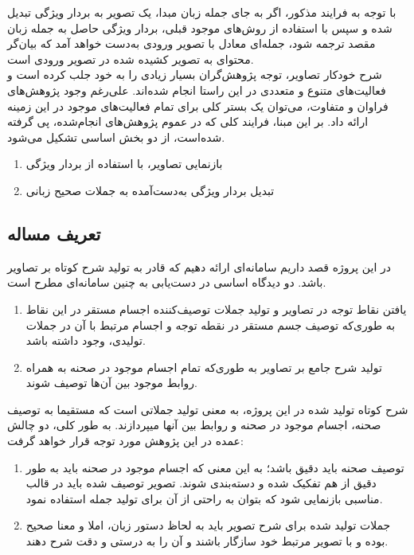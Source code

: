 با توجه به فرایند مذکور، اگر به جای جمله زبان مبدا، یک تصویر به بردار ویژگی تبدیل شده و سپس با استفاده از روش‌های موجود قبلی، بردار ویژگی حاصل به جمله زبان مقصد ترجمه شود، جمله‌ای معادل با تصویر ورودی به‌دست خواهد آمد  که بیان‌گر محتوای به تصویر کشیده شده در تصویر ورودی است\cite{xu2015show}.
\\
شرح خودکار تصاویر، توجه پژوهش‌گران بسیار زیادی را به خود جلب کرده است و فعالیت‌های متنوع و متعددی در این راستا انجام شده‌اند. علی‌رغم وجود پژوهش‌‌های فراوان و متفاوت، می‌توان یک بستر کلی برای تمام فعالیت‌های موجود در این زمینه ارائه داد. بر این مبنا، فرایند کلی که در عموم پژوهش‌های انجام‌شده، پی گرفته شده‌است، از دو بخش اساسی تشکیل می‌شود.
\begin{enumerate}
\item بازنمایی تصاویر، با استفاده از بردار ویژگی
\item تبدیل بردار ويژگی به‌دست‌آمده به جملات صحیح زبانی
\end{enumerate}


\subsection{تعریف مساله}
در این پروژه قصد داریم سامانه‌ای ارائه دهیم که قادر به تولید شرح کوتاه بر تصاویر باشد. دو دیدگاه اساسی در دست‌یابی به چنین سامانه‌ای مطرح است.
\begin{enumerate}
\item
 یافتن نقاط توجه 
در تصاویر و تولید جملات توصیف‌کننده اجسام مستقر در این نقاط به طوری‌که توصیف جسم مستقر در نقطه توجه و اجسام مرتبط با آن در جملات تولیدی، وجود داشته باشد.
\item  تولید شرح جامع بر تصاویر به طوری‌که تمام اجسام موجود در صحنه به همراه روابط موجود بین آن‌ها توصیف شوند. 
\end{enumerate}

شرح کوتاه تولید شده در این پروژه، به معنی تولید جملاتی است که مستقیما به توصیف صحنه، اجسام موجود در صحنه و روابط بین آن­ها می­پردازند.
به طور کلی، دو چالش عمده در این پژوهش مورد توجه قرار خواهد گرفت:
\begin{enumerate}
\item  توصیف صحنه باید دقیق باشد؛ به این معنی که اجسام موجود در صحنه باید به طور دقیق از هم تفکیک شده و دسته‌بندی شوند. تصویر توصیف شده باید در قالب مناسبی بازنمایی شود که بتوان به راحتی از آن برای تولید جمله استفاده نمود.
\item  جملات تولید شده برای شرح تصویر باید به لحاظ دستور زبان، املا و معنا صحیح بوده و با تصویر مرتبط خود سازگار باشند و آن را به درستی و دقت شرح دهند.
\end{enumerate}

